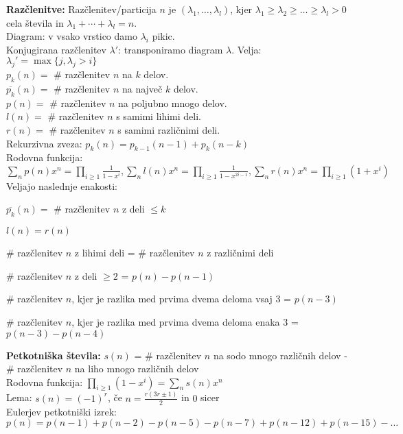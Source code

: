 \documentclass[a4paper, oneside, 12pt]{article}
\theoremstyle{definition}
\newenvironment{itemize*}{\vspace{-10pt}\begin{itemize}\setlength{\itemsep}{0pt}\setlength{\parskip}{2pt}}{\end{itemize}}
\begin{document}
\textbf{Razčlenitve:} Razčlenitev/particija $n$ je $(\lambda_1, \ldots, \lambda_l)$,
kjer $\lambda_1 \geq \lambda_2 \geq \ldots \geq \lambda_l > 0$ cela števila in
$\lambda_1 + \cdots + \lambda_l = n$.\\
Diagram: v vsako vrstico damo $\lambda_i$ pikic.\\
Konjugirana razčlenitev $\lambda'$: transponiramo diagram $\lambda$. Velja: $\lambda_j' = \max\{j, \lambda_j > i\}$\\
$p_k(n) = $ \# razčlenitev $n$ na $k$ delov.\\
$\overline{p_k}(n) = $ \# razčlenitev $n$ na največ $k$ delov.\\
$p(n) = $ \# razčlenitev $n$ na poljubno mnogo delov.\\
$l(n) = $ \# razčlenitev $n$ s samimi lihimi deli.\\
$r(n) = $ \# razčlenitev $n$ s samimi različnimi deli.\\
Rekurzivna zveza: $p_k(n) = p_{k-1}(n-1) + p_k(n-k)$\\
Rodovna funkcija: $\sum_n p(n) x^n = \prod_{i \geq 1} \frac{1}{1 - x^i}, \sum_n l(n) x^n = \prod_{i \geq 1} \frac{1}{1 - x^{2i-1}}, \sum_n r(n) x^n = \prod_{i \geq 1} (1 + x^i)$\\
Veljajo naslednje enakosti:
\begin{itemize*}
  \item $\overline{p_k} (n) = $ \# razčlenitev $n$ z deli $\leq k$
  \item $l(n) = r(n)$
  \item \# razčlenitev $n$ z lihimi deli = \# razčlenitev $n$ z različnimi deli
  \item \# razčlenitev $n$ z deli $\geq 2$ = $p(n) - p(n-1)$
  \item \# razčlenitev $n$, kjer je razlika med prvima dvema deloma vsaj 3 = $p(n-3)$
  \item \# razčlenitev $n$, kjer je razlika med prvima dvema deloma enaka 3 = $p(n-3) - p(n-4)$
\end{itemize*}

\textbf{Petkotniška števila:} $s(n)$ = \# razčlenitev $n$ na sodo mnogo
različnih delov - \# razčlenitev $n$ na liho mnogo različnih delov\\
Rodovna funkcija: $\prod_{i \geq 1} (1 - x^i) = \sum_n s(n) x^n$\\
Lema: $s(n) = (-1)^r$, če $n = \frac{r (3r \pm 1)}{2}$ in $0$ sicer\\
Eulerjev petkotniški izrek: $p(n) = p(n-1) + p(n-2) - p(n-5) - p(n-7) + p(n-12) + p(n-15) - \ldots$
\end{document}
